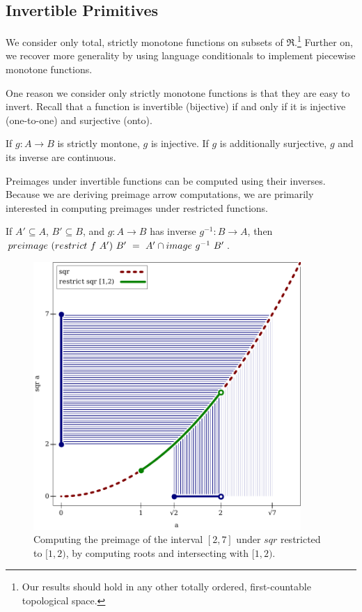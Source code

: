 \subsection{Invertible Primitives}

We consider only total, strictly monotone functions on subsets of $\Re$.\footnote{Our results should hold in any other totally ordered, first-countable topological space.}
Further on, we recover more generality by using language conditionals to implement piecewise monotone functions.

One reason we consider only strictly monotone functions is that they are easy to invert.
Recall that a function is invertible (bijective) if and only if it is injective (one-to-one) and surjective (onto).

\begin{lemma}
\label{lem:monotone-implies-invertible}
If $g : A \to B$ is strictly montone, $g$ is injective.
If $g$ is additionally surjective, $g$ and its inverse are continuous.
\end{lemma}

Preimages under invertible functions can be computed using their inverses.
Because we are deriving preimage arrow computations, we are primarily interested in computing preimages under restricted functions.

\begin{lemma}
\label{lem:invertible-function-preimages}
If $A' \subseteq A$, $B' \subseteq B$, and $g : A \to B$ has inverse $g^{-1} : B \to A$, then $preimage~(restrict~f~A')~B'\ =\ A' \cap image~g^{-1}~B'$.
\end{lemma}

\begin{figure}[!tb]
\centering
\includegraphics[width=4in]{figures/preimage-by-inverse-image}
\caption[{Computing the preimage of $[2,7]$}]{Computing the preimage of the interval $[2,7]$ under $sqr$ restricted to $[1,2)$, by computing roots and intersecting with $[1,2)$.}
\label{fig:sqr-preimage}
\end{figure}

